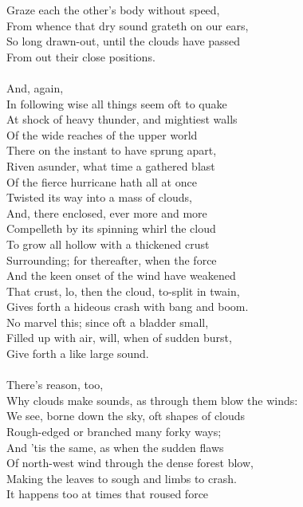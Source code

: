 Graze each the other's body without speed,\\
From whence that dry sound grateth on our ears,\\
So long drawn-out, until the clouds have passed\\
From out their close positions.\\
\\
And, again,\\
In following wise all things seem oft to quake\\
At shock of heavy thunder, and mightiest walls\\
Of the wide reaches of the upper world\\
There on the instant to have sprung apart,\\
Riven asunder, what time a gathered blast\\
Of the fierce hurricane hath all at once\\
Twisted its way into a mass of clouds,\\
And, there enclosed, ever more and more\\
Compelleth by its spinning whirl the cloud\\
To grow all hollow with a thickened crust\\
Surrounding; for thereafter, when the force\\
And the keen onset of the wind have weakened\\
That crust, lo, then the cloud, to-split in twain,\\
Gives forth a hideous crash with bang and boom.\\
No marvel this; since oft a bladder small,\\
Filled up with air, will, when of sudden burst,\\
Give forth a like large sound.\\
\\
There's reason, too,\\
Why clouds make sounds, as through them blow the winds:\\
We see, borne down the sky, oft shapes of clouds\\
Rough-edged or branched many forky ways;\\
And 'tis the same, as when the sudden flaws\\
Of north-west wind through the dense forest blow,\\
Making the leaves to sough and limbs to crash.\\
It happens too at times that roused force\\

